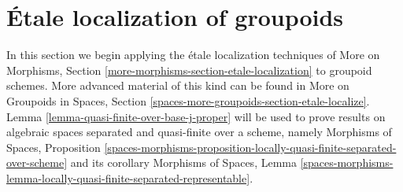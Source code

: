 \documentclass{stacks-project}
\theoremstyle{plain}
\theoremstyle{definition}
\theoremstyle{remark}
\numberwithin{equation}{subsection}
\begin{document}
\section{\'Etale localization of groupoids}
\label{section-etale-localize}

\noindent
In this section we begin applying the \'etale localization techniques of
More on Morphisms, Section \ref{more-morphisms-section-etale-localization}
to groupoid schemes. More advanced material of this kind can be found in
More on Groupoids in Spaces,
Section \ref{spaces-more-groupoids-section-etale-localize}.
Lemma \ref{lemma-quasi-finite-over-base-j-proper}
will be used to prove results on algebraic spaces
separated and quasi-finite over a scheme, namely
Morphisms of Spaces, Proposition
\ref{spaces-morphisms-proposition-locally-quasi-finite-separated-over-scheme}
and its corollary
Morphisms of Spaces, Lemma
\ref{spaces-morphisms-lemma-locally-quasi-finite-separated-representable}.
\end{document}
